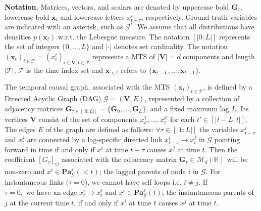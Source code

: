 \textbf{Notation. } Matrices, vectors, and scalars are denoted by uppercase bold $\boldsymbol{G}_{\tau}$, lowercase bold $\boldsymbol{x}_t$ and lowercase letters $x_{t-\tau}^i$, respectively. Ground-truth variables are indicated with an asterisk, such as $\mathcal{G}^*$. We assume that all distributions have densities $p\left(\boldsymbol{x}_{t}\right)$ w.r.t. the Lebesgue measure. The notation $[|0: L|]$ represents the set of integers $\{0,...,L\}$ and $|\cdot|$ denotes set cardinality. The notation $(\boldsymbol{x}_t)_{t \in \mathcal{T}} = (x_t^i)_{i \in \mathbf{V},t \in \mathcal{T}}$ represents a MTS of $|\mathbf{V}| = d$ components and length $|\mathcal{T}|$, $\mathcal{T}$ is the time index set and $\boldsymbol{x}_{<t}$ refers to $\{\boldsymbol{x}_{t-L},...,\boldsymbol{x}_{t-1}\}$. 
\begin{mybox}\begin{definition} The temporal causal graph, associated with the MTS $(\boldsymbol{x}_t)_{t \in \mathcal{T}}$, is defined by a Directed Acyclic Graph (DAG) $\mathcal{G}=(\mathbf{V}, E)$, represented by a collection of adjacency matrices $\boldsymbol{G}_{\tau \in [|0: L|]}=\{\boldsymbol{G}_{0},\dots,\boldsymbol{G}_{L}\}$, and a fixed maximum lag $L$. Its vertices $\mathbf{V}$ consist of the set of components $x_{t'}^1, \ldots, x_{t'}^d$ for each $t' \in [|t-L:t|]$. The edges $E$ of the graph are defined as follows: $\forall \tau \in [|1:L|]$ the variables $x_{t-\tau}^i$ and $x_t^j$ are connected by a lag-specific directed link $x_{t-\tau}^i \rightarrow x_t^j$ in $\mathcal{G}$ pointing forward in time if and only if $x^i$ at time $ t- \tau $ causes $x^j$ at time $t$. Then the coefficient $[G_{\tau}]_{i j}$ associated with the adjacency matrix $\boldsymbol{G}_{\tau} \in \mathcal{M}_{d}(\mathbb{R})$ will be non-zero and $x^i \in \mathbf{P a}_\mathcal{G}^j(<t)$; the lagged parents of node $i$ in $\mathcal{G}$. For instantaneous links ($\tau = 0$), we cannot have self loops i.e. $i \neq j$. If $\tau=0,\text{ we have an edge } x_{t}^i \rightarrow x_t^j \text{ and } x^i \in \mathbf{P a}_\mathcal{G}^j(t)$; the instantaneous parents of $j$ at the current time $t$, if and only if $x^i$ at time $ t$ causes $x^j$ at time $t$.
\label{definitionn1}
\end{definition}\end{mybox}
